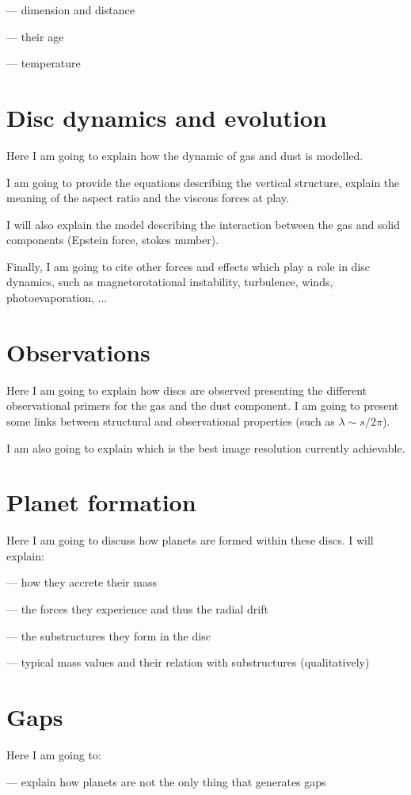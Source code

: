 \documentclass[a4paper,10pt]{report}
\begin{document}
— dimension and distance

— their age

— temperature

\section{Disc dynamics and evolution}
Here I am going to explain how the dynamic of gas and dust is modelled.

I am going to provide the equations describing the vertical structure, explain
the meaning of the aspect ratio and the viscous forces at play.

I will also explain the model describing the interaction
between the gas and solid components (Epstein force, stokes number).

Finally, I am going to cite other forces and effects which play a role in disc dynamics,
such as magnetorotational instability, turbulence, winds, photoevaporation, ...

\section{Observations}
Here I am going to explain how discs are observed presenting the different observational primers 
for the gas and the dust component. I am going to present some links between structural and observational 
properties (such as $\lambda \sim s/2\pi$).

I am also going to explain which is the best image resolution currently achievable.

\section{Planet formation}
Here I am going to discuss how planets are formed within these discs. 
I will explain: 

    — how they accrete their mass

    — the forces they experience and thus the radial drift

    — the substructures they form in the disc

    — typical mass values and their relation with substructures (qualitatively) 

\section{Gaps}
Here I am going to:

— explain how planets are not the only thing that generates gaps
\end{document}
